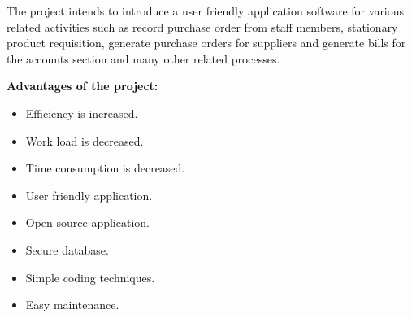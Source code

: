 \documentclass[12pt]{report}
\renewcommand{\_}{\kern-1.5pt\textunderscore\kern-1.5pt}
\begin{document}
\begin{justify}
\textcolor[HTML]{0D0D0D}{The project intends to introduce a user friendly application software for various related activities such as record purchase order from staff members, stationary product requisition, generate purchase orders for suppliers and generate bills for the accounts section and many other related processes.}
\end{justify}\par


\vspace{\baselineskip}
\begin{justify}
\textbf{\textcolor[HTML]{0D0D0D}{Advantages of the project:}}
\end{justify}\par

\begin{itemize}
	\item \textcolor[HTML]{0D0D0D}{Efficiency is increased. }\par

	\item \textcolor[HTML]{0D0D0D}{Work load is decreased.}\par

	\item \textcolor[HTML]{0D0D0D}{Time consumption is decreased.}\par

	\item \textcolor[HTML]{0D0D0D}{User friendly application.}\par

	\item \textcolor[HTML]{0D0D0D}{Open source application.}\par

	\item \textcolor[HTML]{0D0D0D}{Secure database.}\par

	\item \textcolor[HTML]{0D0D0D}{Simple coding techniques.}\par

	\item \textcolor[HTML]{0D0D0D}{Easy maintenance.}
\end{itemize}\par


\vspace{\baselineskip}
\setlength{\parskip}{0.84pt}

\vspace{\baselineskip}
\end{document}
